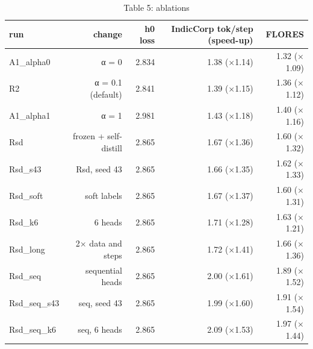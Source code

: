 \begin{table}[t]
\centering
\small
\caption{Table 5: ablations}
\label{tab:table5_ablations}
\begin{tabular}{lrrrr}
\toprule
run & change & h0 loss & IndicCorp tok/step (speed-up) & FLORES \\
\midrule
A1\_alpha0 & α = 0 & 2.834 & 1.38 ($\times$1.14) & 1.32 ($\times$1.09) \\
R2 & α = 0.1 (default) & 2.841 & 1.39 ($\times$1.15) & 1.36 ($\times$1.12) \\
A1\_alpha1 & α = 1 & 2.981 & 1.43 ($\times$1.18) & 1.40 ($\times$1.16) \\
Rsd & frozen + self-distill & 2.865 & 1.67 ($\times$1.36) & 1.60 ($\times$1.32) \\
Rsd\_s43 & Rsd, seed 43 & 2.865 & 1.66 ($\times$1.35) & 1.62 ($\times$1.33) \\
Rsd\_soft & soft labels & 2.865 & 1.67 ($\times$1.37) & 1.60 ($\times$1.31) \\
Rsd\_k6 & 6 heads & 2.865 & 1.71 ($\times$1.28) & 1.63 ($\times$1.21) \\
Rsd\_long & 2$\times$ data and steps & 2.865 & 1.72 ($\times$1.41) & 1.66 ($\times$1.36) \\
Rsd\_seq & sequential heads & 2.865 & 2.00 ($\times$1.61) & 1.89 ($\times$1.52) \\
Rsd\_seq\_s43 & seq, seed 43 & 2.865 & 1.99 ($\times$1.60) & 1.91 ($\times$1.54) \\
Rsd\_seq\_k6 & seq, 6 heads & 2.865 & 2.09 ($\times$1.53) & 1.97 ($\times$1.44) \\
\bottomrule
\end{tabular}
\end{table}
